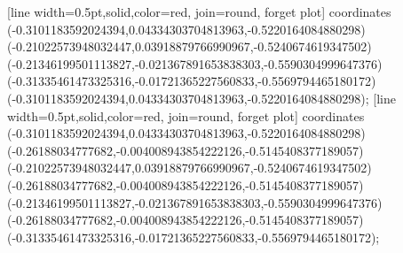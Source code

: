 [line width=0.5pt,solid,color=red, join=round, forget plot] coordinates {(-0.3101183592024394,0.04334303704813963,-0.5220164084880298) (-0.21022573948032447,0.03918879766990967,-0.5240674619347502) (-0.21346199501113827,-0.021367891653838303,-0.5590304999647376) (-0.31335461473325316,-0.01721365227560833,-0.5569794465180172) (-0.3101183592024394,0.04334303704813963,-0.5220164084880298)};
[line width=0.5pt,solid,color=red, join=round, forget plot] coordinates {(-0.3101183592024394,0.04334303704813963,-0.5220164084880298) (-0.26188034777682,-0.004008943854222126,-0.5145408377189057) (-0.21022573948032447,0.03918879766990967,-0.5240674619347502) (-0.26188034777682,-0.004008943854222126,-0.5145408377189057) (-0.21346199501113827,-0.021367891653838303,-0.5590304999647376) (-0.26188034777682,-0.004008943854222126,-0.5145408377189057) (-0.31335461473325316,-0.01721365227560833,-0.5569794465180172)};

